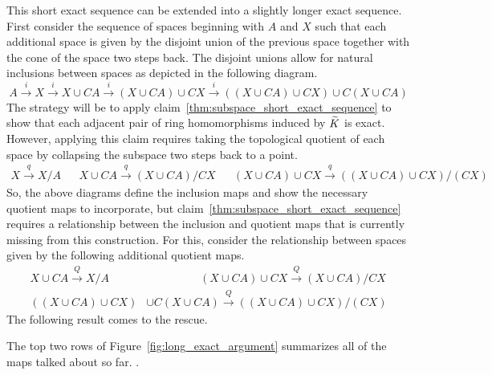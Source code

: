 \documentclass[../sean_thesis.tex]{subfiles}
\begin{document}
This short exact sequence can be extended into a slightly longer exact sequence. First consider the sequence of spaces beginning with $A$ and $X$ such that each additional space is given by the disjoint union of the previous space together with the cone of the space two steps back. The disjoint unions allow for natural inclusions between spaces as depicted in the following diagram.
\begin{equation*}
	A \xrightarrow{i} X \xrightarrow{i} X \cup CA \xrightarrow{i} (X \cup CA) \cup CX \xrightarrow{i} ((X \cup CA) \cup CX) \cup C(X \cup CA)
\end{equation*}
The strategy will be to apply claim~\ref{thm:subspace_short_exact_sequence} to show that each adjacent pair of ring homomorphisms induced by $\widetilde{K}$ is exact. However, applying this claim requires taking the topological quotient of each space by collapsing the subspace two steps back to a point.
\begin{align*}
	X \xrightarrow{q} X/A &&
 X \cup CA \xrightarrow{q} (X \cup CA)/CX && 
 (X \cup CA) \cup CX \xrightarrow{q} ((X \cup CA) \cup CX)/(CX) 
\end{align*}
So, the above diagrams define the inclusion maps and show the necessary quotient maps to incorporate, but claim~\ref{thm:subspace_short_exact_sequence} requires a relationship between the inclusion and quotient maps that is currently missing from this construction. For this, consider the relationship between spaces given by the following additional quotient maps. 
\begin{align*}
	X \cup CA \xrightarrow{Q} X/A & \hspace{2cm}
	(X \cup CA) \cup CX \xrightarrow{Q} (X \cup CA)/CX\\
	((X \cup CA) \cup CX) &\cup C(X \cup CA) \xrightarrow{Q} ((X \cup CA) \cup CX)/(CX) 
\end{align*}
The following result comes to the rescue.

\begin{claim}
\label{thm:Q_to_ism}
\end{claim}


The top two rows of Figure~\ref{fig:long_exact_argument} summarizes all of the maps talked about so far. .
\end{document}
